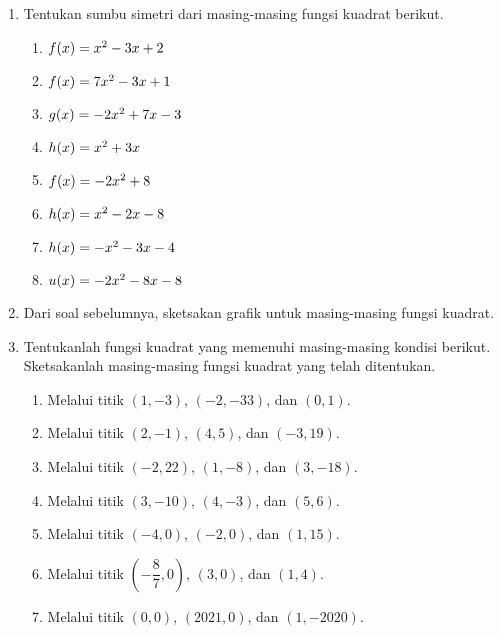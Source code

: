 \begin{enumerate}[topsep=0pt]
\begin{multcols}
\begin{enumerate}
				\end{enumerate}
			\end{multcols}
			\item Tentukan sumbu simetri dari masing-masing fungsi kuadrat berikut.
			\begin{multcols}
				\begin{enumerate}
					\item $ \mathop{}\!{f}{\left({x}\right)} = x^{2} - 3x + 2 $
					\item $ \mathop{}\!{f}{\left({x}\right)} = 7x^{2} - 3x + 1 $
					\item $ \mathop{}\!{g}{\left({x}\right)} = -2x^{2} + 7x - 3 $
					\item $ \mathop{}\!{h}{\left({x}\right)} = x^{2} + 3x $
					\item $ \mathop{}\!{f}{\left({x}\right)} = -2x^{2} + 8 $
					\item $ \mathop{}\!{h}{\left({x}\right)} = x^{2} - 2x - 8 $
					\item $ \mathop{}\!{h}{\left({x}\right)} = -x^{2} - 3x - 4 $
					\item $ \mathop{}\!{u}{\left({x}\right)} = -2x^{2} - 8x - 8 $
				\end{enumerate}
			\end{multcols}
			\item Dari soal sebelumnya, sketsakan grafik untuk masing-masing fungsi kuadrat.
			\item Tentukanlah fungsi kuadrat yang memenuhi masing-masing kondisi berikut. Sketsakanlah masing-masing fungsi kuadrat yang telah ditentukan.
			\begin{enumerate}
				\item Melalui titik $ \left(1, -3\right) $, $ \left(-2, -33\right) $, dan $ \left(0, 1\right) $.
				\item Melalui titik $ \left(2, -1\right) $, $ \left(4, 5\right) $, dan $ \left(-3, 19\right) $.
				\item Melalui titik $ \left(-2, 22\right) $, $ \left(1, -8\right) $, dan $ \left(3, -18\right) $.
				\item Melalui titik $ \left(3, -10\right) $, $ \left(4, -3\right) $, dan $ \left(5, 6\right) $.
				\item Melalui titik $ \left(-4, 0\right) $, $ \left(-2, 0\right) $, dan $ \left(1, 15\right) $.
				\item Melalui titik $ \left(-\dfrac{8}{7}, 0\right) $, $ \left(3, 0\right) $, dan $ \left(1, 4\right) $.
				\item Melalui titik $ \left(0, 0\right) $, $ \left(2021, 0\right) $, dan $ \left(1, -2020\right) $.

\end{enumerate}
\end{enumerate}
